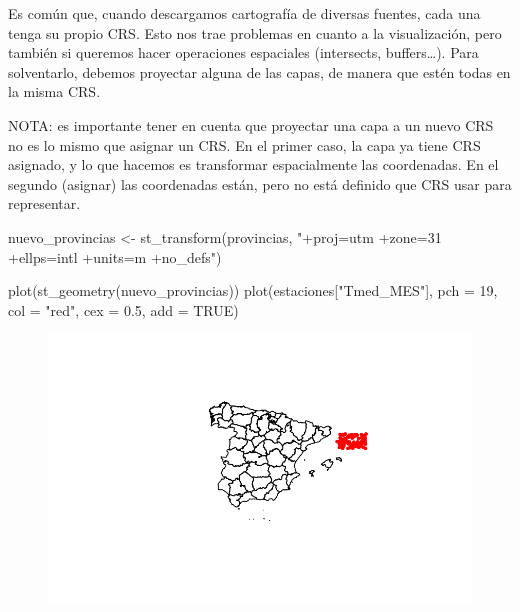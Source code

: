 \documentclass[
  letterpaper,
  DIV=11,
  numbers=noendperiod]{scrreprt}
\newenvironment{Shaded}{\begin{snugshade}}{\end{snugshade}}
\newcommand{\AttributeTok}[1]{\textcolor[rgb]{0.40,0.45,0.13}{#1}}
\newcommand{\ConstantTok}[1]{\textcolor[rgb]{0.56,0.35,0.01}{#1}}
\newcommand{\DecValTok}[1]{\textcolor[rgb]{0.68,0.00,0.00}{#1}}
\newcommand{\FloatTok}[1]{\textcolor[rgb]{0.68,0.00,0.00}{#1}}
\newcommand{\FunctionTok}[1]{\textcolor[rgb]{0.28,0.35,0.67}{#1}}
\newcommand{\NormalTok}[1]{\textcolor[rgb]{0.00,0.23,0.31}{#1}}
\newcommand{\OtherTok}[1]{\textcolor[rgb]{0.00,0.23,0.31}{#1}}
\newcommand{\StringTok}[1]{\textcolor[rgb]{0.13,0.47,0.30}{#1}}
\begin{document}
Es común que, cuando descargamos cartografía de diversas fuentes, cada
una tenga su propio CRS. Esto nos trae problemas en cuanto a la
visualización, pero también si queremos hacer operaciones espaciales
(intersects, buffers\ldots). Para solventarlo, debemos proyectar alguna
de las capas, de manera que estén todas en la misma CRS.

NOTA: es importante tener en cuenta que proyectar una capa a un nuevo
CRS no es lo mismo que asignar un CRS. En el primer caso, la capa ya
tiene CRS asignado, y lo que hacemos es transformar espacialmente las
coordenadas. En el segundo (asignar) las coordenadas están, pero no está
definido que CRS usar para representar.

\begin{Shaded}
\begin{Highlighting}[]
\NormalTok{nuevo\_provincias }\OtherTok{\textless{}{-}} \FunctionTok{st\_transform}\NormalTok{(provincias, }\StringTok{"+proj=utm +zone=31 +ellps=intl +units=m +no\_defs"}\NormalTok{)}

\FunctionTok{plot}\NormalTok{(}\FunctionTok{st\_geometry}\NormalTok{(nuevo\_provincias))}
\FunctionTok{plot}\NormalTok{(estaciones[}\StringTok{"Tmed\_MES"}\NormalTok{], }\AttributeTok{pch =} \DecValTok{19}\NormalTok{, }\AttributeTok{col =} \StringTok{"red"}\NormalTok{, }\AttributeTok{cex =} \FloatTok{0.5}\NormalTok{, }\AttributeTok{add =} \ConstantTok{TRUE}\NormalTok{) }
\end{Highlighting}
\end{Shaded}

\begin{figure}[H]

{\centering \includegraphics{03_DatosEspaciales_files/figure-pdf/unnamed-chunk-34-1.pdf}

}

\end{figure}
\end{document}
